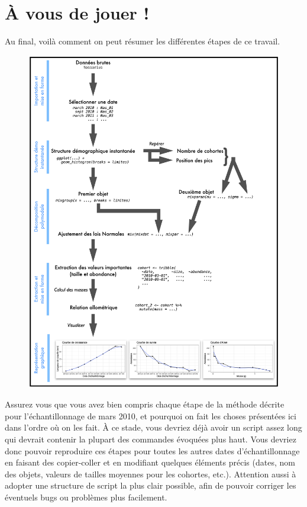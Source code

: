 \documentclass[
  a4paper,
  DIV=11,
  numbers=noendperiod,
  oneside]{scrreprt}
\begin{document}
\hypertarget{uxe0-vous-de-jouer}{%
\section{À vous de jouer !}\label{uxe0-vous-de-jouer}}

Au final, voilà comment on peut résumer les différentes étapes de ce
travail.

\begin{figure}

{\centering \includegraphics{./images/diagram.png}

}

\end{figure}

Assurez vous que vous avez bien compris chaque étape de la méthode
décrite pour l'échantillonnage de mars 2010, et pourquoi on fait les
choses présentées ici dans l'ordre où on les fait. À ce stade, vous
devriez déjà avoir un script assez long qui devrait contenir la plupart
des commandes évoquées plus haut. Vous devriez donc pouvoir reproduire
ces étapes pour toutes les autres dates d'échantillonnage en faisant des
copier-coller et en modifiant quelques éléments précis (dates, nom des
objets, valeurs de tailles moyennes pour les cohortes, etc.). Attention
aussi à adopter une structure de script la plus clair possible, afin de
pouvoir corriger les éventuels bugs ou problèmes plus facilement.
\end{document}
